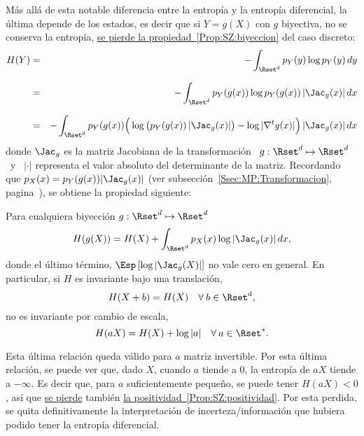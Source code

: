 M\'as  all\'a de esta  notable diferencia  entre la  entrop\'ia y  la entrop\'ia
diferencial, la \'ultima depende de los estados,  es decir que si $Y = g(X)$ con
$g$  biyectiva,  no se  conserva  la  entrop\'ia,  \ie \underline{se  pierde  la
  propiedad~\ref{Prop:SZ:biyeccion}} del caso discreto:
%
\begin{eqnarray*}
H(Y) & = & - \int_{\Rset^d} p_Y(y) \log p_Y(y) \, dy\\[2.5mm]
%
& = &  - \int_{\Rset^d} p_Y(g(x)) \log p_Y(g(x)) \, |\Jac_g(x)| \, dx\\[2.5mm]
%
& = & - \int_{\Rset^d} p_Y(g(x)) \Big( \log \big( p_Y(g(x)) \, |\Jac_g(x)| \big) -
\log |\nabla^t g(x)| \Big) \, |\Jac_g(x)| \, dx
\end{eqnarray*}
%
donde $\Jac_g$ es la matriz Jacobiana
de  la  transformaci\'on  \   $g:  \Rset^d  \mapsto  \Rset^d$  \  
\ y  \ $|\cdot|$  representa el  valor absoluto del  determinante de  la matriz.
Recordando      que     $p_X(x)      =      p_Y(g(x))     |\Jac_g(x)|$      (ver
subsecci\'on~\ref{Ssec:MP:Transformacion},
pagina~\pageref{Ssec:MP:Transformacion}), se obtiene la propiedad siguiente:
%
\begin{propiedadesC}\setcounter{enumi}{\value{PropBiyeccion}}
%
\item\label{Prop:SZ:biyeccionC}
Para  cualquiera biyecci\'on $g:  \Rset^d \mapsto  \Rset^d$
  \[
  H(g(X)) = H(X) + \int_{\Rset^d} p_X(x) \log |\Jac_g(x)| \, dx,
  \]
  donde el \'ultimo t\'ermino, $\Esp\left[  \log |\Jac_g(X)| \right]$ no vale cero
  en general.  En particular, si $H$ es invariante bajo una translaci\'on,
  \[
  H(X+b) = H(X) \quad \forall \: b \in \Rset^d,
  \]
  no  es invariante  por cambio  de escala,
  \[
  H(a X) = H(X) + \log |a| \quad \forall \: a \in \Rset^*.
  \]
\end{propiedadesC}
%
Esta \'ultima  relaci\'on queda v\'alido  para $a$ matriz invertible.   Por esta
\'ultima  relaci\'on, se puede  ver que,  dado $X$,  cuando $a$  tiende a  0, la
entrop\'ia de $a X$ tiende a  $-\infty$.  Es decir que, para $a$ suficientemente
peque\~no,  se  puede  tener $H(a  X)  <  0$,  as\'i que  \underline{se  pierde}
tambi\'en   \underline{la   positividad~\ref{Prop:SZ:positividad}}.   Por   esta
perdida, se quita definitivamente la interpretaci\'on de incerteza/informaci\'on
que hubiera podido tener la entrop\'ia diferencial.

